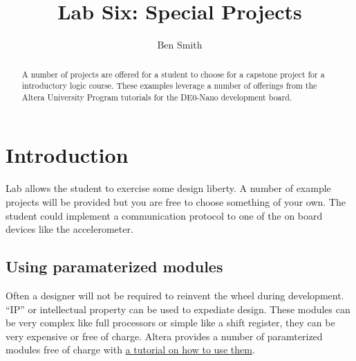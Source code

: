 \title{Lab Six: Special Projects}
\author{Ben Smith}




  \maketitle
    \begin{abstract}
      A number of projects are offered for a student to choose for a capstone project for a introductory logic course. These examples leverage a number of offerings from the Altera University Program tutorials for the DE0-Nano development board.
    \end{abstract}

  \section{\bfseries Introduction}
     Lab allows the student to exercise some design liberty. A number of example projects will be provided but you are free to choose something of your own. The student could implement a communication protocol to one of the on board devices like the accelerometer.

    \subsection{Using paramaterized modules}
      Often a designer will not be required to reinvent the wheel during development. ``IP'' or intellectual property can be used to expediate design. These modules can be very complex like full processors or simple like a shift register, they can be very expensive or free of charge. Altera provides a number of paramterized modules free of charge with \href{ftp://ftp.altera.com/up/pub/Altera_Material/13.0/Tutorials/Verilog/Using_Library_Modules.pdf}{a tutorial on how to use them}.

